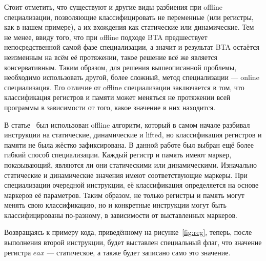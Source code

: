 Стоит отметить, что существуют и другие виды разбиения при offline специализации, позволяющие классифицировать
не переменные (или регистры, как в нашем примере), а их вхождения как статические или динамические.
Тем не менее, ввиду того, что при offline подходе BTA предшествует непосредственной самой фазе специализации,
а значит и результат BTA остаётся неизменным на всём её протяжении,
такое решение всё же является консервативным.
Таким образом, для решения вышеописанной проблемы, необходимо использовать другой, более сложный, метод специализации --- online специализация. Его отличие от offline специализации заключается в том, что классификация регистров и памяти может меняться не протяжении всей программы в зависимости от того, какое значение в них находится.

В статье~\cite{PEMC} был использован offline алгоритм, который в самом начале разбивал инструкции на статические, динамические и lifted, но классификация регистров и памяти не была жёстко зафиксирована. В данной работе был выбран ещё более гибкий способ специализации. Каждый регистр и память имеют маркер, показывающий, являются ли они статическими или динамическими. Изначально статические и динамические значения имеют соответствующие маркеры. При специализации очередной инструкции, её классификация определяется на основе маркеров её параметров. Таким образом, не только регистры и память могут менять свою классификацию, но и конкретные инструкции могут быть классифицированы по-разному, в зависимости от выставленных маркеров.

Возвращаясь к примеру кода, приведённому на рисунке~\ref{fig:reg}, теперь, после выполнения второй инструкции,
будет выставлен специальный флаг, что значение регистра $eax$ --- статическое, а также будет записано само это значение.


